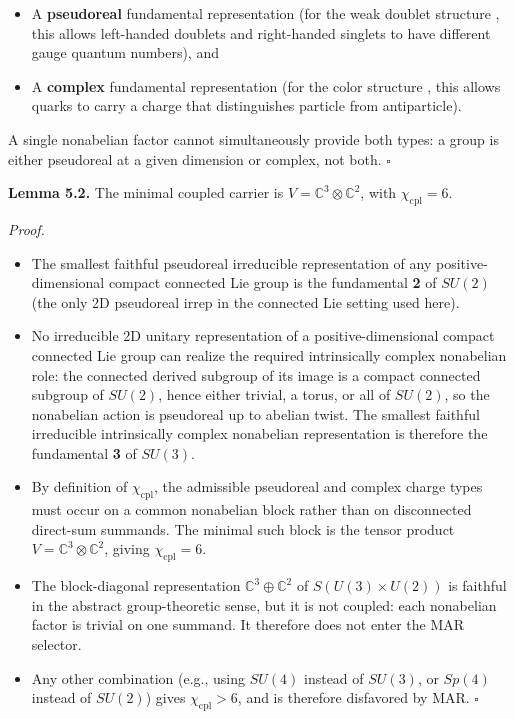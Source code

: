 \begin{itemize}
\tightlist
\item
  A \textbf{pseudoreal} fundamental representation (for the weak doublet structure , this allows left-handed doublets and right-handed singlets to have different gauge quantum numbers), and
\item
  A \textbf{complex} fundamental representation (for the color structure , this allows quarks to carry a charge that distinguishes particle from antiparticle).
\end{itemize}

A single nonabelian factor cannot simultaneously provide both types: a group is either pseudoreal at a given dimension or complex, not both. \(\square\)

\textbf{Lemma 5.2.} The minimal coupled carrier is \(V = \mathbb{C}^3 \otimes \mathbb{C}^2\), with \(\chi_{\mathrm{cpl}} = 6\).

\emph{Proof.}

\begin{itemize}
\tightlist
\item
  The smallest faithful pseudoreal irreducible representation of any positive-dimensional compact connected Lie group is the fundamental \textbf{2} of \(SU(2)\) (the only 2D pseudoreal irrep in the connected Lie setting used here).
\item
  No irreducible 2D unitary representation of a positive-dimensional compact connected Lie group can realize the required intrinsically complex nonabelian role: the connected derived subgroup of its image is a compact connected subgroup of \(SU(2)\), hence either trivial, a torus, or all of \(SU(2)\), so the nonabelian action is pseudoreal up to abelian twist. The smallest faithful irreducible intrinsically complex nonabelian representation is therefore the fundamental \textbf{3} of \(SU(3)\).
\item
  By definition of \(\chi_{\mathrm{cpl}}\), the admissible pseudoreal and complex charge types must occur on a common nonabelian block rather than on disconnected direct-sum summands. The minimal such block is the tensor product \(V = \mathbb{C}^3 \otimes \mathbb{C}^2\), giving \(\chi_{\mathrm{cpl}} = 6\).
\item
  The block-diagonal representation \(\mathbb{C}^3 \oplus \mathbb{C}^2\) of \(S(U(3) \times U(2))\) is faithful in the abstract group-theoretic sense, but it is not coupled: each nonabelian factor is trivial on one summand. It therefore does not enter the MAR selector.
\item
  Any other combination (e.g., using \(SU(4)\) instead of \(SU(3)\), or \(Sp(4)\) instead of \(SU(2)\)) gives \(\chi_{\mathrm{cpl}} > 6\), and is therefore disfavored by MAR. \(\square\)
\end{itemize}

